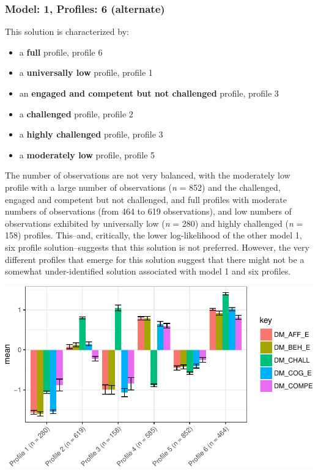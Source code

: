 \documentclass[]{book}
\providecommand{\tightlist}{%
  \setlength{\itemsep}{0pt}\setlength{\parskip}{0pt}}
\theoremstyle{definition}
\theoremstyle{definition}
\theoremstyle{definition}
\theoremstyle{remark}
\begin{document}
\subsubsection{Model: 1, Profiles: 6
(alternate)}\label{model-1-profiles-6-alternate}

This solution is characterized by:

\begin{itemize}
\tightlist
\item
  a \textbf{full} profile, profile 6
\item
  a \textbf{universally low} profile, profile 1
\item
  an \textbf{engaged and competent but not challenged} profile, profile
  3
\item
  a \textbf{challenged} profile, profile 2
\item
  a \textbf{highly challenged} profile, profile 3
\item
  a \textbf{moderately low} profile, profile 5
\end{itemize}

The number of observations are not very balanced, with the moderately
low profile with a large number of observations (\emph{n} = 852) and the
challenged, engaged and competent but not challenged, and full profiles
with moderate numbers of observations (from 464 to 619 observations),
and low numbers of observations exhibited by universally low (\emph{n} =
280) and highly challenged (\emph{n} = 158) profiles. This--and,
critically, the lower log-likelihood of the other model 1, six profile
solution--suggests that this solution is not preferred. However, the
very different profiles that emerge for this solution suggest that there
might not be a somewhat under-identified solution associated with model
1 and six profiles.

\begin{center}\includegraphics[width=0.8\linewidth]{rosenberg-dissertation_files/figure-latex/m1_6p-alt-1} \end{center}
\end{document}
